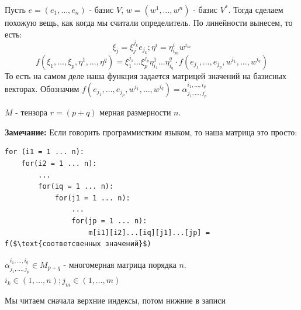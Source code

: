 Пусть $e = (e_1,\ldots, e_n)$ - базис $V$, $w = (w^1,\ldots, w^n)$ - базис $V^*$. Тогда сделаем похожую вещь, как когда мы считали определитель. По линейности вынесем, то есть:
$$\xi_j = \xi_j^{j_k}e_{j_k};\eta^i = \eta_{i_m}^iw^{i_m}$$
$$f(\xi_1,\ldots,\xi_p,\eta^1,\ldots, \eta^q) = \xi_1^{j_1}\ldots\xi_p^{j_p}\eta_{i_1}^1 \ldots \eta^q_{i_q} \cdot f(e_{j_1},\ldots, e_{j_p},w^{i_1},\ldots, w^{i_q})$$
То есть  на самом деле наша функция задается матрицей значений на базисных векторах. Обозначим $f(e_{j_1},\ldots, e_{j_p},w^{i_1},\ldots, w^{i_q}) = \alpha_{j_1,\ldots,j_p}^{i_1,\ldots,i_q}$

 $M$ -  тензора $r = (p+q)$ мерная размерности $n$. 

\textbf{Замечание:} Если говорить программистким языком, то наша матрица это просто:

\begin{lstlisting}[mathescape]
for (i1 = 1 ... n):
    for(i2 = 1 ... n):
        ...
        for(iq = 1 ... n):
            for(j1 = 1 ... n):
                ...
                for(jp = 1 ... n):
                    m[i1][i2]...[iq][j1]...[jp] = f($\text{соответсвенных значений}$)
\end{lstlisting}


$\alpha^{i_1,\ldots,i_q}_{j_1,\ldots, j_p} \in M_{p+q}$ - многомерная матрица порядка $n$. $i_k \in (1,\ldots,n); j_m \in (1,\ldots, m)$

Мы читаем сначала верхние индексы, потом нижние в записи


